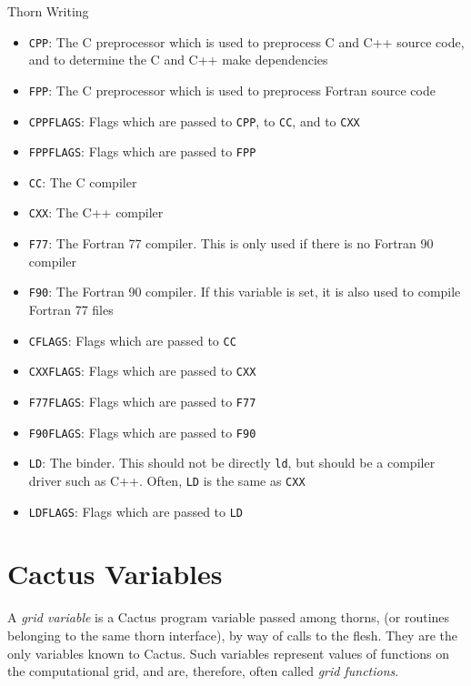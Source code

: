 \begin{cactuspart}{Thorn Writing}
\begin{itemize}
\item \texttt{CPP}: The C preprocessor which is used to preprocess C
  and C++ source code, and to determine the C and C++ make
  dependencies
\item \texttt{FPP}: The C preprocessor which is used to preprocess
  Fortran source code
\item \texttt{CPPFLAGS}: Flags which are passed to \texttt{CPP}, to
  \texttt{CC}, and to \texttt{CXX}
\item \texttt{FPPFLAGS}: Flags which are passed to \texttt{FPP}
\item \texttt{CC}: The C compiler
\item \texttt{CXX}: The C++ compiler
\item \texttt{F77}: The Fortran 77 compiler.  This is only used if
  there is no Fortran 90 compiler
\item \texttt{F90}: The Fortran 90 compiler.  If this variable is
  set, it is also used to compile Fortran 77 files
\item \texttt{CFLAGS}: Flags which are passed to \texttt{CC}
\item \texttt{CXXFLAGS}: Flags which are passed to \texttt{CXX}
\item \texttt{F77FLAGS}: Flags which are passed to \texttt{F77}
\item \texttt{F90FLAGS}: Flags which are passed to \texttt{F90}
\item \texttt{LD}: The binder.  This should not be directly
  \texttt{ld}, but should be a compiler driver such as C++.
  Often, \texttt{LD} is the same as \texttt{CXX}
\item \texttt{LDFLAGS}: Flags which are passed to \texttt{LD}
\end{itemize}


\section{Cactus Variables}
\label{chap:cactus_variables}

A \textit{grid variable} is a Cactus program variable passed among thorns,
(or routines belonging to the same thorn interface),
by way of calls to the flesh.
They are the only variables known to Cactus.
Such variables represent values of functions on the computational grid,
and are, therefore, often called \textit{grid functions}.


\end{cactuspart}
